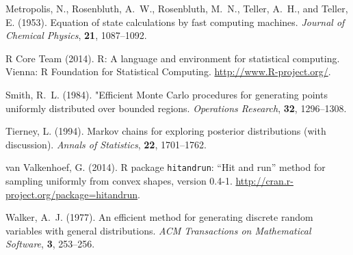 \documentclass[11pt]{article}
\begin{document}
\begin{thebibliography}{}
Metropolis, N., Rosenbluth, A.~W., Rosenbluth, M.~N., Teller, A.~H., and
    Teller, E. (1953).
\newblock Equation of state calculations by fast computing machines.
\newblock \emph{Journal of Chemical Physics}, \textbf{21}, 1087--1092.

R Core Team (2014).
\newblock R: A language and environment for statistical computing.
\newblock Vienna: R Foundation for Statistical Computing.
\newblock \url{http://www.R-project.org/}.

Smith, R.~L. (1984).
\newblock "Efficient Monte Carlo procedures for generating points
    uniformly distributed over bounded regions.
\newblock \emph{Operations Research}, \textbf{32}, 1296--1308.

Tierney, L. (1994).
\newblock Markov chains for exploring posterior distributions (with discussion).
\newblock \emph{Annals of Statistics}, \textbf{22}, 1701--1762.

van Valkenhoef, G. (2014).
\newblock R package \texttt{hitandrun}: ``Hit and run'' method for sampling
    uniformly from convex shapes, version 0.4-1.
\newblock \url{http://cran.r-project.org/package=hitandrun}.

Walker, A.~J. (1977).
\newblock An efficient method for generating discrete random variables
    with general distributions.
\newblock \emph{ACM Transactions on Mathematical Software}, \textbf{3},
    253--256.

\end{thebibliography}
\end{document}
